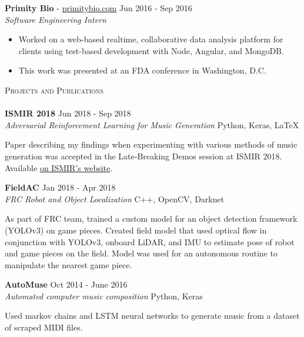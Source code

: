 \documentclass[a4paper]{article}
\newcommand{\lineunder} {
	\vspace*{-8pt} \\
	\hspace*{-18pt} \hrulefill \\
}
\newcommand{\header} [1] {
	{\hspace*{-18pt}\vspace*{6pt} \textsc{#1}}
	\vspace*{-6pt} \lineunder
}
\begin{document}
\noindent
\textbf{Primity Bio} - \url{primitybio.com} \hfill Jun 2016 - Sep 2016\\
\textit{Software Engineering Intern} \\
\vspace{-6mm}
\begin{itemize} \itemsep 0.1pt
	\item Worked on a web-based realtime, collaborative data analysis platform for clients using test-based development with Node, Angular, and MongoDB.
	\item This work was presented at an FDA conference in Washington, D.C.
\end{itemize}



\header{Projects and Publications}
\noindent
\textbf{ISMIR 2018} \hfill Jun 2018 - Sep 2018\\
\textit{Adversarial Reinforcement Learning for Music Generation} \hfill Python, Keras, \LaTeX\\
\vspace{-25pt}
\begin{paragraph}{}
Paper describing my findings when experimenting with various methods of music generation was accepted in the Late-Breaking Demos session at ISMIR 2018. Available \href{http://ismir2018.ircam.fr/pages/events-lbd.html}{on \underline{ISMIR's website}}.\\
\end{paragraph}

\noindent
\textbf{FieldAC} \hfill Jan 2018 - Apr 2018\\
\textit{FRC Robot and Object Localization} \hfill C++, OpenCV, Darknet\\
\vspace{-25pt}
\begin{paragraph}{}
As part of FRC team, trained a custom model for an object detection framework (YOLOv3) on game pieces. Created field model that used optical flow in conjunction with YOLOv3, onboard LiDAR, and IMU to estimate pose of robot and game pieces on the field. Model was used for an autonomous routine to manipulate the nearest game piece.\\

\end{paragraph}
\noindent
\textbf{AutoMuse} \hfill Oct 2014 - June 2016\\
\textit{Automated computer music composition} \hfill Python, Keras
\vspace{-13pt}
\begin{paragraph}{}
Used markov chains and LSTM neural networks to generate music from a dataset of scraped MIDI files. \\ 

\end{paragraph}
\end{document}
